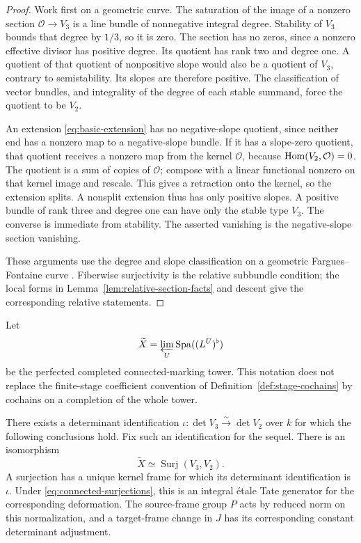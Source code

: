\begin{proof}
Work first on a geometric curve.  The saturation of the image of a
nonzero section $\mathcal O\to V_3$ is a line bundle of nonnegative
integral degree.  Stability of $V_3$ bounds that degree by $1/3$,
so it is zero.  The section has no zeros, since a nonzero effective
divisor has positive degree.  Its quotient has rank two and degree
one.  A quotient of that quotient of nonpositive slope would also
be a quotient of $V_3$, contrary to semistability.  Its slopes are
therefore positive.  The classification of vector bundles, and
integrality of the degree of each stable summand, force the
quotient to be $V_2$.

An extension \eqref{eq:basic-extension} has no negative-slope
quotient, since neither end has a nonzero map to a negative-slope
bundle.  If it has a slope-zero quotient, that quotient receives
a nonzero map from the kernel $\mathcal O$, because
$\operatorname{Hom}(V_2,\mathcal O)=0$.  The quotient is a sum of copies of
$\mathcal O$; compose with a linear functional nonzero on that
kernel image and rescale.  This gives a retraction onto the
kernel, so the extension splits.  A nonsplit
extension thus has only positive slopes.  A positive bundle of
rank three and degree one can have only the stable type $V_3$.
The converse is immediate from stability.  The asserted vanishing
is the negative-slope section vanishing.

These arguments use the degree and slope classification on a
geometric Fargues--Fontaine curve
\cite[Proposition~II.2.10 and Theorem~II.2.14]{FS21}.
Fiberwise surjectivity is the relative subbundle condition; the
local forms in Lemma~\ref{lem:relative-section-facts} and descent
give the corresponding relative statements.
\end{proof}

Let
\[
 \widetilde X=\varprojlim_U\operatorname{Spa}((L^U)^\flat)
\]
be the perfected completed connected-marking tower.  This notation
does not replace the finite-stage coefficient convention of
Definition~\ref{def:stage-cochains} by cochains on a completion of
the whole tower.

\begin{proposition}
\label{prop:integral-frames}
There exists a determinant identification
$\iota:\det V_3\xrightarrow{\sim}\det V_2$ over $k$
for which the following conclusions hold.  Fix such an identification
for the sequel.  There is an isomorphism
\begin{equation}
 \widetilde X\simeq\operatorname{Surj}(V_3,V_2).
 \label{eq:connected-surjections}
\end{equation}
A surjection has a unique kernel frame for which its determinant
identification is $\iota$.  Under
\eqref{eq:connected-surjections}, this is an integral étale Tate
generator for the corresponding deformation.
The source-frame group $P$ acts by reduced norm on this normalization,
and a target-frame change in $J$ has its corresponding constant
determinant adjustment.
\end{proposition}

